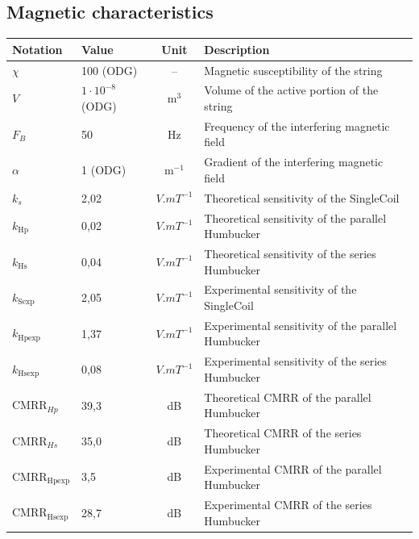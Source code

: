 \documentclass[11pt, a4paper]{article}
\begin{document}
\subsection{Magnetic characteristics}
\begin{center}
\small
\begin{tabularx}{\textwidth}{llcX}
\toprule
\textbf{Notation} & \textbf{Value} & \textbf{Unit} & \textbf{Description} \\
\midrule
$\chi$ & 100 (ODG) & -- & Magnetic susceptibility of the string \\
$V$ & $1 \cdot 10^{-8}$ (ODG) & m$^{3}$ & Volume of the active portion of the string \\
\midrule
$F_{B}$ & 50 & Hz & Frequency of the interfering magnetic field \\
$\alpha$ & 1 (ODG) & m$^{-1}$ & Gradient of the interfering magnetic field \\
\midrule
$k_{s}$ & 2,02 & $V.mT^{-1}$ & Theoretical sensitivity of the SingleCoil \\
$k_{\text{Hp}}$ & 0,02 & $V.mT^{-1}$ & Theoretical sensitivity of the parallel Humbucker \\
$k_{\text{Hs}}$ & 0,04 & $V.mT^{-1}$ & Theoretical sensitivity of the series Humbucker \\
$k_{\text{Sexp}}$ & 2,05 & $V.mT^{-1}$ & Experimental sensitivity of the SingleCoil \\
$k_{\text{Hpexp}}$ & 1,37 & $V.mT^{-1}$ & Experimental sensitivity of the parallel Humbucker \\
$k_{\text{Hsexp}}$ & 0,08 & $V.mT^{-1}$ & Experimental sensitivity of the series Humbucker \\
\midrule
$\text{CMRR}_{Hp}$ & 39,3 & dB & Theoretical CMRR of the parallel Humbucker \\
$\text{CMRR}_{Hs}$ & 35,0 & dB & Theoretical CMRR of the series Humbucker \\
$\text{CMRR}_{\text{Hpexp}}$ & 3,5 & dB & Experimental CMRR of the parallel Humbucker \\
$\text{CMRR}_{\text{Hsexp}}$ & 28,7 & dB & Experimental CMRR of the series Humbucker \\
\bottomrule
\end{tabularx}
\end{center}
\end{document}
